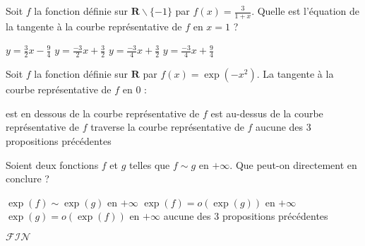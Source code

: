 \documentclass{exam}[5pts]
\begin{document}
\begin{questions}
\question Soit $f$ la fonction définie sur $\mathbf{R}\backslash\{-1\}$ par $f(x) = \frac{3}{1+x}$. Quelle est l'équation de la tangente à la courbe représentative de $f$ en $x=1$ ?

\begin{choices}
 \choice $y = \frac{3}{2} x - \frac{9}{4}$
 \choice $y = \frac{-3}{2} x + \frac{3}{2}$
 \choice $y = \frac{-3}{4} x + \frac{3}{2}$
 \choice $y = \frac{-3}{4} x + \frac{9}{4}$
\end{choices}

\question Soit $f$ la fonction définie sur $\mathbf{R}$ par $f(x) = \exp(-x^2)$. La tangente à la courbe représentative de $f$ en $0$ : 

\begin{choices}
 \choice est  en dessous de la courbe représentative de $f$ 
 \choice est au-dessus de la courbe représentative de $f$ 
 \choice traverse la courbe représentative de $f$ 
 \choice aucune des 3 propositions précédentes
\end{choices}

\question Soient deux fonctions $f$ et $g$ telles que $f \sim g$ en $+\infty$. Que peut-on directement en conclure ?

\begin{choices}
 \choice $\exp(f) \sim \exp(g)$ en $+\infty$ 
 \choice $\exp(f) = o(\exp(g))$ en $+\infty$ 
 \choice $\exp(g) = o(\exp(f))$ en $+\infty$ 
 \choice aucune des 3 propositions précédentes
\end{choices}

\end{questions}

\vspace{3\baselineskip}
\begin{center}
	\huge $\mathcal{FIN}$
\end{center}
\end{document}
